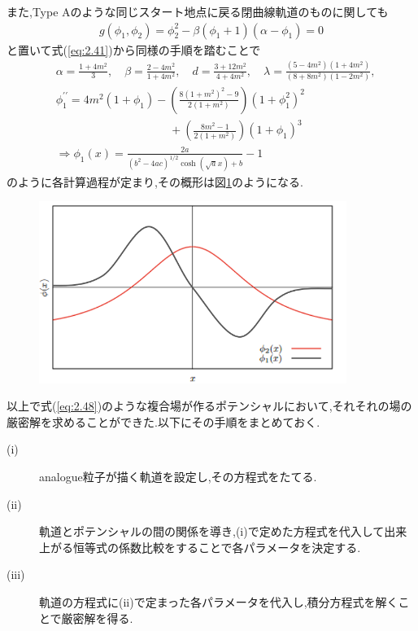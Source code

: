 \documentclass[dvipdfmx,11pt,a4paper,oneside,openany]{jsbook}
\begin{document}
また,Type Aのような同じスタート地点に戻る閉曲線軌道のものに関しても
\begin{align}
    g\left(\phi_{1}, \phi_{2}\right)=\phi_{2}^{2}-\beta\left(\phi_{1}+1\right)\left(\alpha-\phi_{1}\right)=0
\end{align}
と置いて式(\ref{eq:2.41})から同様の手順を踏むことで
\begin{align}
     & \alpha                    =\frac{1+4 m^{2}}{3}, \quad \beta=\frac{2-4 m^{2}}{1+4 m^{2}}, \quad d=\frac{3+12 m^{2}}{4+4 m^{2}},\quad \lambda=\frac{\left(5-4 m^{2}\right)\left(1+4 m^{2}\right)}{\left(8+8 m^{2}\right)\left(1-2 m^{2}\right)}, \\
     & \phi_{1}^{\prime \prime}= 4 m^{2}\left(1+\phi_{1}\right)-\left(\frac{8\left(1+m^{2}\right)^{2}-9}{2\left(1+m^{2}\right)}\right)\left(1+\phi_{1}^{2}\right)^{2}\nonumber                                                                        \\
     & \qquad\ \ \ \ \ \ \ \ \ \ \ \ \ \ \ \ \ \ \ \ \ \ \ \ \ \ \ \ \ \ \ \ \ \ \ \ +\left(\frac{8 m^{2}-1}{2\left(1 + m^{2}\right)}\right)\left(1+\phi_{1}\right)^{3}                                                                               \\
     & \Rightarrow \phi_{1}(x)=\frac{2 a}{\left(b^{2}-4 a c\right)^{1 / 2} \cosh (\sqrt{a} x)+b}-1
\end{align}
のように各計算過程が定まり,その概形は図\ref{2-coupled-phi_typeA}のようになる.
\begin{figure}[H]
    \centering
    \includegraphics[width=10cm]{figure/2-coupled-phi_typeA.png}
    \caption{}
    \label{2-coupled-phi_typeA}
\end{figure}
以上で式(\ref{eq:2.48})のような複合場が作るポテンシャルにおいて,それそれの場の厳密解を求めることができた.以下にその手順をまとめておく.
\begin{screen}
    \begin{description}
        \item[(i)] analogue粒子が描く軌道を設定し,その方程式をたてる.
        \item[(ii)] 軌道とポテンシャルの間の関係を導き,(i)で定めた方程式を代入して出来上がる恒等式の係数比較をすることで各パラメータを決定する.
        \item[(iii)] 軌道の方程式に(ii)で定まった各パラメータを代入し,積分方程式を解くことで厳密解を得る.
    \end{description}
\end{screen}
\end{document}
